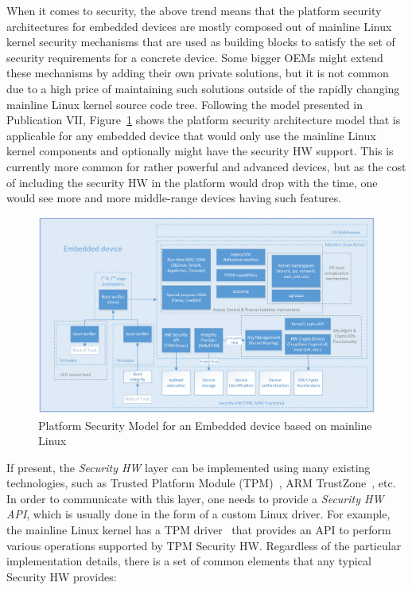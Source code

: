 When it comes to security, the above trend means that the platform security architectures for embedded devices are mostly composed out of mainline Linux kernel security mechanisms that are used as building blocks to satisfy the set of security requirements for a concrete device. Some bigger OEMs might extend these mechanisms by adding their own private solutions, but it is not common due to a high price of maintaining such solutions outside of the rapidly changing mainline Linux kernel source code tree. Following the model presented in Publication VII, Figure~\ref{fig:platsec} shows the platform security architecture model that is applicable for any embedded device that would only use the mainline Linux kernel components and optionally might have the security HW support. This is currently more common for rather powerful and advanced devices, but as the cost of including the security HW in the platform would drop with the time, one would see more and more middle-range devices having such features. 


\begin{figure}[t]
	\centering
		\includegraphics[width=1\textwidth]{figures/LinuxKernelPlatSecModel.png}
	\caption{Platform Security Model for an Embedded device based on mainline Linux}
	\label{fig:platsec}
\end{figure}

If present, the \textit{Security HW} layer can be implemented using many existing technologies, such as Trusted Platform Module (TPM)~\cite{tpm}, ARM TrustZone~\cite{trustzone}, etc. In order to communicate with this layer, one needs to provide a \textit{Security HW API}, which is usually done in the form of a custom Linux driver. For example, the mainline Linux kernel has a TPM driver~\cite{tpmdriver} that provides an API to perform various operations supported by TPM Security HW. Regardless of the particular implementation details, there is a set of common elements that any typical Security HW provides:

